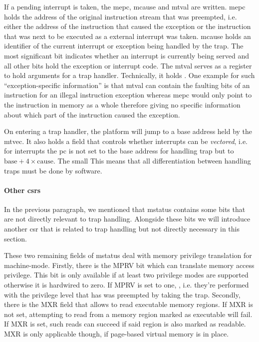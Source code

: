 If a pending interrupt is taken, the \gls{mepc}, \gls{mcause} and \gls{mtval} are written.
\gls{mepc} holds the address of the original instruction stream that was preempted, i.e. either the address of the instruction that caused the exception or the instruction that was next to be executed as a external interrupt was taken.
\gls{mcause} holds an identifier of the current interrupt or exception being handled by the trap.
The most significant bit indicates whether an interrupt is currently being served and all other bits hold the exception or interrupt code.
The \gls{mtval} serves as a register to hold arguments for a trap handler.
Technically, it holds .
One example for such \enquote{exception-specific information} is that \gls{mtval} can contain the faulting bits of an instruction for an illegal instruction exception whereas \gls{mepc} would only point to the instruction in memory as a whole therefore giving no specific information about which part of the instruction caused the exception.

On entering a trap handler, the platform will jump to a base address held by the \gls{mtvec}.
It also holds a field that controls whether interrupts can be \textit{vectored}, i.e. for interrupts the \gls{pc} is not set to the base address for handling trap but to $ \text{base} + 4 \times \text{cause} $.
The small
This means that all differentiation between handling traps must be done by software.

\paragraph{Other \glspl{csr}}
In the previous paragraph, we mentioned that \gls{mstatus} contains some bits that are not directly relevant to trap handling.
Alongside these bits we will introduce another \gls{csr} that is related to trap handling but not directly necessary in this section.

These two remaining fields of \gls{mstatus} deal with memory privilege translation for machine-mode.
Firstly, there is the MPRV bit which can translate memory access privilege.
This bit is only available if at least two privilege modes are supported otherwise it is hardwired to zero.
If MPRV is set to one, , i.e. they're performed with the privilege level that has was preempted by taking the trap.
Secondly, there is the MXR field that allows to read executable memory regions.
If MXR is not set, attempting to read from a memory region marked as executable will fail.
If MXR is set, such reads can succeed if said region is also marked as readable.
MXR is only applicable though, if page-based virtual memory is in place.

